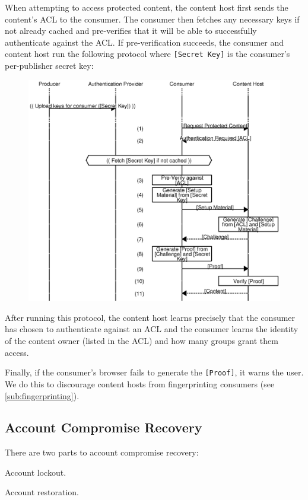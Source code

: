 \documentclass[pdftex,12pt,a4papaer]{report}
\begin{document}
When attempting to access protected content, the content host first sends the
content's ACL to the consumer. The consumer then fetches any necessary keys if
not already cached and pre-verifies that it will be able to successfully
authenticate against the ACL. If pre-verification succeeds, the consumer and
content host run the following protocol where \verb=[Secret Key]= is the
consumer's per-publisher secret key:

\begin{figure}[H]
    \includegraphics{auth.eps}
\end{figure}

After running this protocol, the content host learns precisely that the consumer
has chosen to authenticate against an ACL and the consumer learns the identity
of the content owner (listed in the ACL) and how many groups grant them access.

Finally, if the consumer's browser fails to generate the \verb=[Proof]=, it
warns the user. We do this to discourage content hosts from fingerprinting
consumers (see \ref{sub:fingerprinting}).

\subsection{Account Compromise Recovery}

There are two parts to account compromise recovery:

\begin{compactenum}
\item Account lockout.
\item Account restoration.
\end{compactenum}
\end{document}
